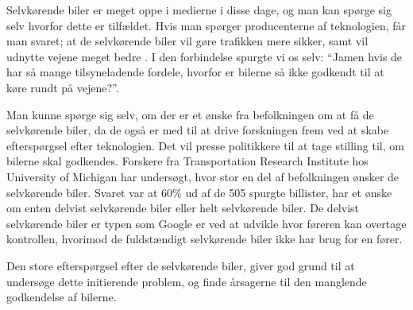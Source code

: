 Selvkørende biler er meget oppe i medierne i disse dage, og man kan spørge sig selv hvorfor dette er tilfældet. Hvis man spørger producenterne af teknologien, får man svaret; at de selvkørende biler vil gøre trafikken mere sikker, samt vil udnytte vejene meget bedre \cite{GOOG_SITE}. I den forbindelse spurgte vi os selv: ``Jamen hvis de har så mange tilsyneladende fordele, hvorfor er bilerne så ikke godkendt til at køre rundt på vejene?''. 

Man kunne spørge sig selv, om der er et ønske fra befolkningen om at få de selvkørende biler, da de også er med til at drive forskningen frem ved at skabe efterspørgsel efter teknologien. Det vil presse politikkere til at tage stilling til, om bilerne skal godkendes. Forskere fra Transportation Research Institute hos University of Michigan har undersøgt, hvor stor en del af befolkningen ønsker de selvkørende biler\cite{UMTRI}. Svaret var at 60\% ud af de 505 spurgte billister, har et ønske om enten delvist selvkørende biler eller helt selvkørende biler. De delvist selvkørende biler er typen som Google er ved at udvikle hvor føreren kan overtage kontrollen, hvorimod de fuldstændigt selvkørende biler ikke har brug for en fører.

Den store efterspørgsel efter de selvkørende biler, giver god grund til at undersøge dette initierende problem, og finde årsagerne til den manglende godkendelse af bilerne.